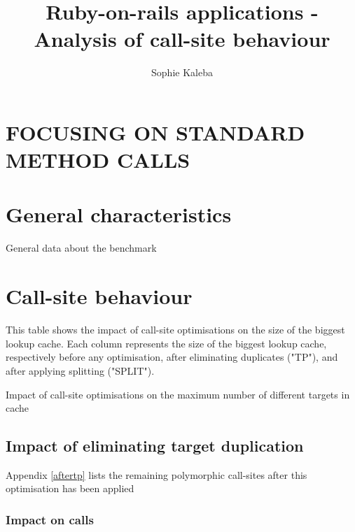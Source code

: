 \documentclass[preprint]{acmart}
\let\StartupGeneralMetrics\GeneralMetrics
\let\StartupExtent\Extent
\begin{document}
\title{Ruby-on-rails applications - Analysis of call-site behaviour}

\author{Sophie Kaleba}

\maketitle


\section{FOCUSING ON STANDARD METHOD CALLS}

\section{General characteristics}

\begin{table}[h!]
	\centering
	\resizebox{\linewidth}{!}{
	\StartupGeneralMetrics
	}
	\caption{General data about the benchmark}
\end{table}

\section{Call-site behaviour}

This table shows the impact of call-site optimisations on the size of the biggest lookup cache.
Each column represents the size of the biggest lookup cache, respectively before any optimisation, after eliminating duplicates ("TP"), and after applying splitting ("SPLIT").

\begin{table}[h!]
	\centering
	\StartupExtent
	\caption{Impact of call-site optimisations on the maximum number of different targets in cache}
\end{table}

\subsection{Impact of eliminating target duplication}

Appendix \ref{aftertp} lists the remaining polymorphic call-sites after this optimisation has been applied

\subsubsection{\textbf{Impact on calls}}
\end{document}
